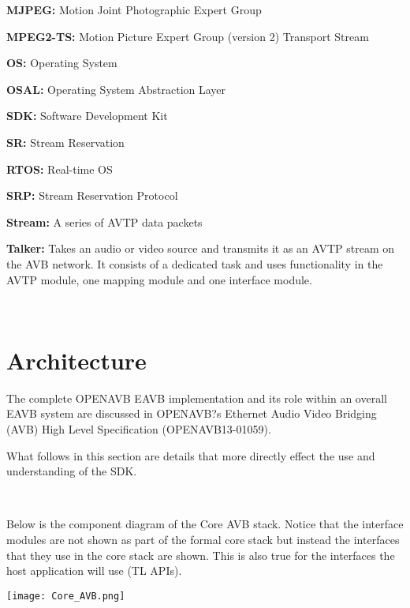 {\bfseries M\+J\+P\+EG\+:} Motion Joint Photographic Expert Group

{\bfseries M\+P\+E\+G2-\/\+TS\+:} Motion Picture Expert Group (version 2) Transport Stream

{\bfseries OS\+:} Operating System

{\bfseries O\+S\+AL\+:} Operating System Abstraction Layer

{\bfseries S\+DK\+:} Software Development Kit

{\bfseries SR\+:} Stream Reservation

{\bfseries R\+T\+OS\+:} Real-\/time OS

{\bfseries S\+RP\+:} Stream Reservation Protocol

{\bfseries Stream\+:} A series of A\+V\+TP data packets

{\bfseries Talker\+:} Takes an audio or video source and transmits it as an A\+V\+TP stream on the A\+VB network. It consists of a dedicated task and uses functionality in the A\+V\+TP module, one mapping module and one interface module.

~\newline
\hypertarget{sdk_overview_sdk_overview_architecture}{}\section{Architecture }\label{sdk_overview_sdk_overview_architecture}
The complete O\+P\+E\+N\+A\+VB E\+A\+VB implementation and its role within an overall E\+A\+VB system are discussed in O\+P\+E\+N\+A\+VB?s Ethernet Audio Video Bridging (A\+VB) High Level Specification (O\+P\+E\+N\+A\+V\+B13-\/01059).

What follows in this section are details that more directly effect the use and understanding of the S\+DK.

~\newline


Below is the component diagram of the Core A\+VB stack. Notice that the interface modules are not shown as part of the formal core stack but instead the interfaces that they use in the core stack are shown. This is also true for the interfaces the host application will use (TL A\+P\+Is).


\begin{DoxyImage}
\texttt{[image: Core\_AVB.png]}
\caption{Core A\+VB}
\end{DoxyImage}


~\newline


